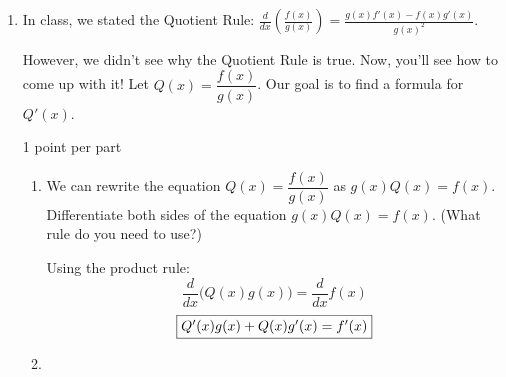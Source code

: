 \documentclass{article}
\begin{document}
\begin{enumerate}
\begin{enumerate}
\begin{enumerate}
    \item
      \begin{problem}[\vfill\newpage]
        $f(x) = \displaystyle \frac{x}{x^2 + 1} $
      \end{problem}

      \begin{solution}
        We cannot rewrite the function so we apply the Quotient Rule:
        \begin{align*}
          f'(x) &= \frac{(x)'(x^2+1) - (x)(x^2+1)'}{(x^2 + 1)^2} \\
          &= \frac{(1)(x^2+1) - (2x)x}{(x^2 + 1)^2} \\
          &= \frac{-x^2+1}{(x^2+1)^2}
        \end{align*}
      \end{solution}

    \end{enumerate}

  \end{enumerate}

\item \label{quotient-rule}

  In class, we stated the Quotient Rule: $\displaystyle \frac{d}{dx} \left( \frac{f(x)}{g(x)} \right) = \frac{g(x) f'(x) - f(x)g'(x)}{g(x)^2}$.

  However, we didn't see why the Quotient Rule is true. Now, you'll see how to come up with it! Let $Q(x) = \dfrac{f(x)}{g(x)}$. Our goal is to find a formula for $Q'(x)$.

  \begin{grading}
    1 point per part
  \end{grading}

  \begin{enumerate}
  \item \label{quotient-rule-step1}

    \begin{problem}[\vfill]
      We can rewrite the equation $Q(x) = \dfrac{f(x)}{g(x)}$ as $g(x) Q(x) = f(x)$. Differentiate both sides of the equation $g(x) Q(x) = f(x)$. (What rule do you need to use?)
    \end{problem}

    \begin{solution}
      Using the product rule:
      $$\frac{d}{dx} \big( Q(x)g(x) \big) = \frac{d}{dx}
      f(x)$$ $$\fbox{$Q'(x)g(x) + Q(x)g'(x) = f'(x)$}$$
  \end{solution}

  \item


\end{enumerate}
\end{enumerate}
\end{document}
